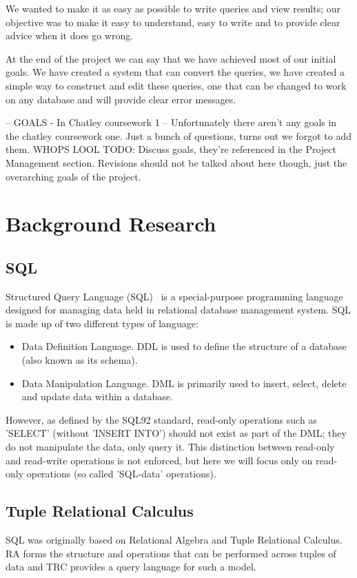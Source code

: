 \documentclass[a4paper, 11pt]{article}
\begin{document}
We wanted to make it as easy as possible to write queries and view results;
our objective was to make it easy to understand, easy to write and to
provide clear advice when it does go wrong.

At the end of the project we can say that we have achieved most of our initial 
goals. We have created a system that can convert the queries, we have created
a simple way to construct and edit these queries, one that can be changed to 
work on any database and will provide clear error messages.

  -- GOALS - In Chatley coursework 1 --
  Unfortunately there aren't any goals in the chatley coursework one.
  Just a bunch of questions, turns out we forgot to add them. WHOPS LOOL
  TODO: Discuss goals, they're referenced in the Project Management
  section. Revisions should not be talked about here though, just the
  overarching goals of the project.

\section{Background Research}
\subsection{SQL}
  Structured Query Language (SQL)~\cite{wiki:SQL} is a special-purpose
  programming language designed for managing data held in relational database
  management system. SQL is made up of two different types of language:

  \begin{itemize}
      \item
        Data Definition Language. DDL is used to define the structure of a
        database (also known as its schema).
      \item
        Data Manipulation Language. DML is primarily used to insert, select,
        delete and update data within a database.
  \end{itemize}

  However, as defined by the SQL92 standard\cite{isoSQL}, read-only operations
  such as 'SELECT' (without 'INSERT INTO') should not exist as part of the DML;
  they do not manipulate the data, only query it. This distinction between
  read-only and read-write operations is not enforced, but here we will focus
  only on read-only operations (so called 'SQL-data' operations).

\subsection{Tuple Relational Calculus}
  SQL was originally based on Relational Algebra and Tuple Relational
  Calculus. RA forms the structure and operations that can be performed
  across tuples of data and TRC provides a query language for such a model.
\end{document}
